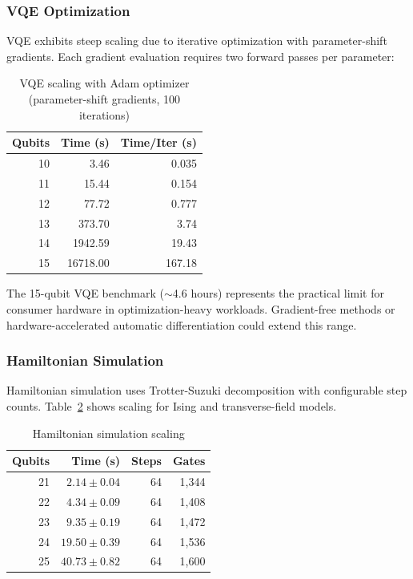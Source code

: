\documentclass[runningheads]{llncs}
\begin{document}
\subsubsection{VQE Optimization}

VQE exhibits steep scaling due to iterative optimization with parameter-shift gradients. Each gradient evaluation requires two forward passes per parameter:

\begin{table}[t]
\caption{VQE scaling with Adam optimizer (parameter-shift gradients, 100 iterations)}
\label{tab:vqe}
\centering
\begin{tabular}{rrr}
\toprule
Qubits & Time (s) & Time/Iter (s) \\
\midrule
10 & 3.46 & 0.035 \\
11 & 15.44 & 0.154 \\
12 & 77.72 & 0.777 \\
13 & 373.70 & 3.74 \\
14 & 1942.59 & 19.43 \\
15 & 16718.00 & 167.18 \\
\bottomrule
\end{tabular}
\end{table}

The 15-qubit VQE benchmark ($\sim$4.6 hours) represents the practical limit for consumer hardware in optimization-heavy workloads. Gradient-free methods or hardware-accelerated automatic differentiation could extend this range.

\subsubsection{Hamiltonian Simulation}

Hamiltonian simulation uses Trotter-Suzuki decomposition with configurable step counts. Table~\ref{tab:hamiltonian} shows scaling for Ising and transverse-field models.

\begin{table}[t]
\caption{Hamiltonian simulation scaling}
\label{tab:hamiltonian}
\centering
\begin{tabular}{rrrr}
\toprule
Qubits & Time (s) & Steps & Gates \\
\midrule
21 & $2.14 \pm 0.04$ & 64 & 1,344 \\
22 & $4.34 \pm 0.09$ & 64 & 1,408 \\
23 & $9.35 \pm 0.19$ & 64 & 1,472 \\
24 & $19.50 \pm 0.39$ & 64 & 1,536 \\
25 & $40.73 \pm 0.82$ & 64 & 1,600 \\
\bottomrule
\end{tabular}
\end{table}
\end{document}
